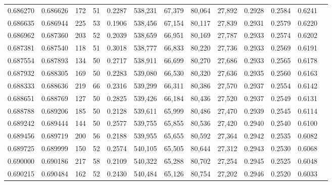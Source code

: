 \begin{tabular}{rrrrrrrrrrrrr}
0.686270 & 0.686626 &    172 &    51 &                                     0.2287 & 538,231 &  67,379 &  80,064 &  27,892 & 0.2928 & 0.2584 & 0.6241 \\
0.686635 & 0.686944 &    225 &    53 &                                     0.1906 & 538,456 &  67,154 &  80,117 &  27,839 & 0.2931 & 0.2579 & 0.6220 \\
0.686962 & 0.687360 &    203 &    52 &                                     0.2039 & 538,659 &  66,951 &  80,169 &  27,787 & 0.2933 & 0.2574 & 0.6202 \\
0.687381 & 0.687540 &    118 &    51 &                                     0.3018 & 538,777 &  66,833 &  80,220 &  27,736 & 0.2933 & 0.2569 & 0.6191 \\
0.687554 & 0.687893 &    134 &    50 &                                     0.2717 & 538,911 &  66,699 &  80,270 &  27,686 & 0.2933 & 0.2565 & 0.6178 \\
0.687932 & 0.688305 &    169 &    50 &                                     0.2283 & 539,080 &  66,530 &  80,320 &  27,636 & 0.2935 & 0.2560 & 0.6163 \\
0.688333 & 0.688636 &    219 &    66 &                                     0.2316 & 539,299 &  66,311 &  80,386 &  27,570 & 0.2937 & 0.2554 & 0.6142 \\
0.688651 & 0.688769 &    127 &    50 &                                     0.2825 & 539,426 &  66,184 &  80,436 &  27,520 & 0.2937 & 0.2549 & 0.6131 \\
0.688788 & 0.689206 &    185 &    50 &                                     0.2128 & 539,611 &  65,999 &  80,486 &  27,470 & 0.2939 & 0.2545 & 0.6114 \\
0.689242 & 0.689444 &    144 &    50 &                                     0.2577 & 539,755 &  65,855 &  80,536 &  27,420 & 0.2940 & 0.2540 & 0.6100 \\
0.689456 & 0.689719 &    200 &    56 &                                     0.2188 & 539,955 &  65,655 &  80,592 &  27,364 & 0.2942 & 0.2535 & 0.6082 \\
0.689725 & 0.689999 &    150 &    52 &                                     0.2574 & 540,105 &  65,505 &  80,644 &  27,312 & 0.2943 & 0.2530 & 0.6068 \\
0.690000 & 0.690186 &    217 &    58 &                                     0.2109 & 540,322 &  65,288 &  80,702 &  27,254 & 0.2945 & 0.2525 & 0.6048 \\
0.690215 & 0.690484 &    162 &    52 &                                     0.2430 & 540,484 &  65,126 &  80,754 &  27,202 & 0.2946 & 0.2520 & 0.6033 \\

\end{tabular}
